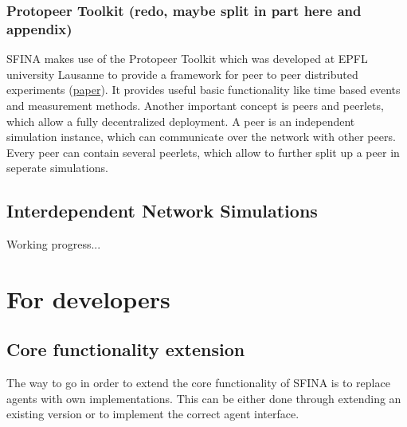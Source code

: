 \documentclass[11pt,fleqn]{book} %
\begin{document}
\section{Protopeer Toolkit (redo, maybe split in part here and appendix)}\label{subsec:protopeer}
SFINA makes use of the Protopeer Toolkit which was developed at EPFL university Lausanne to provide a framework for peer to peer distributed experiments (\href{http://infoscience.epfl.ch/record/128659/files/protopeer_demo.pdf}{paper}). It provides useful basic functionality like time based events and measurement methods. Another important concept is peers and peerlets, which allow a fully decentralized deployment. A peer is an independent simulation instance, which can communicate over the network with other peers. Every peer can contain several peerlets, which allow to further split up a peer in seperate simulations. %


\chapter{Interdependent Network Simulations}\label{sec:interdep}
Working progress...


\part{For developers}


\chapter{Core functionality extension}
\label{ch:core_functionality_extension}
The way to go in order to extend the core functionality of SFINA is to replace agents with own implementations. 
This can be either done through extending an existing version or to implement the correct agent interface.
\end{document}

